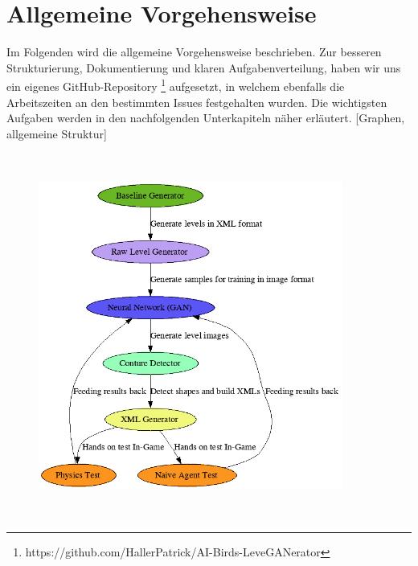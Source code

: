 \section{Allgemeine Vorgehensweise}
Im Folgenden wird die allgemeine Vorgehensweise beschrieben. Zur besseren Strukturierung, Dokumentierung und klaren Aufgabenverteilung, haben wir uns ein eigenes GitHub-Repository \footnote{https://github.com/HallerPatrick/AI-Birds-LeveGANerator} aufgesetzt, in welchem ebenfalls die Arbeitszeiten an den bestimmten Issues festgehalten wurden. Die wichtigsten Aufgaben werden in den nachfolgenden Unterkapiteln näher erläutert. [Graphen, allgemeine Struktur]
\begin{figure}
    \centering
    \includegraphics[height=12cm, width=10cm]{img/project_structure.png}
\end{figure}
